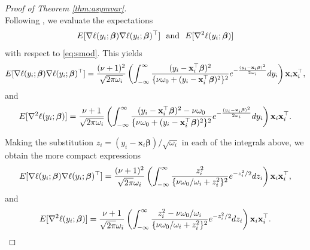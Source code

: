 \documentclass[12pt]{article}
\newcommand{\Exp}[1]{{\rm{E}}[ #1 ]}
\newcommand{\bl}[1]{{\mathbf #1}}
\newcommand{\bs}[1]{\boldsymbol #1}
\begin{document}
\begin{proof}[Proof of Theorem \ref{thm:asymvar}]
\begin{equation*}
\end{equation*}
Following \cite{stefanski_calculus_2002}, we evaluate the expectations
\begin{equation*}
\begin{aligned}
    \Exp{  \nabla \ell(y_i ; \bs{\beta}) \nabla \ell(y_i ; \bs{\beta})^\top}~\text{ and }~\Exp{ \nabla^2 \ell(y_i ; \bs{\beta}) }
\end{aligned}
\end{equation*}
with respect to \eqref{eq:smod}. This yields
\begin{equation}
    \begin{aligned}
        \Exp{  \nabla \ell(y_i ; \bs{\beta}) \nabla \ell(y_i ; \bs{\beta})^\top} = \frac{(\nu+1)^2}{\sqrt{2 \pi \omega_i}} \left(\int_{-\infty}^\infty \frac{(y_i - \bl{x}_i^\top \bs{\beta})^2}{\{\nu \omega_0 + (y_i - \bl{x}_i^\top \bs{\beta})^2\}^2 } e^{-\frac{(y_i - \bl{x}_i \bs{\beta})^2}{2\omega_i}} dy_i \right)\bl{x}_i \bl{x}_i^\top,
    \end{aligned}
\end{equation}
and
\begin{equation}\label{eq:int0}
    \begin{aligned}
        \Exp{ \nabla^2 \ell(y_i ; \bs{\beta}) } = \frac{\nu+1}{\sqrt{2\pi \omega_i}} \left(\int_{-\infty}^\infty \frac{(y_i - \bl{x}_i^\top \bs{\beta})^2 - \nu \omega_0}{\{\nu \omega_0 + (y_i - \bl{x}_i^\top \bs{\beta})^2\}^2} e^{-\frac{(y_i - \bl{x}_i \bs{\beta})^2}{2\omega_i}} dy_i \right) \bl{x}_i \bl{x}_i^\top .
    \end{aligned}
\end{equation}

Making the substitution $z_i = (y_i - \bl{x}_i \bs{\beta})/\sqrt{\omega_i}$ in each of the integrals above, we obtain the more compact expressions
\begin{equation}\label{eq:int1}
    \begin{aligned}
        \Exp{  \nabla \ell(y_i ; \bs{\beta}) \nabla \ell(y_i ; \bs{\beta})^\top} = \frac{(\nu+1)^2}{\sqrt{2 \pi}\omega_i} \left(\int_{-\infty}^\infty \frac{z_i^2}{\{\nu \omega_0/\omega_i + z_i^2\}^2 } e^{-z_i^2 / 2} dz_i \right)\bl{x}_i \bl{x}_i^\top,
    \end{aligned}
\end{equation}
and
\begin{equation}\label{eq:int2}
    \begin{aligned}
        \Exp{ \nabla^2 \ell(y_i ; \bs{\beta}) } = \frac{\nu+1}{\sqrt{2\pi} \omega_i} \left(\int_{-\infty}^\infty \frac{z_i^2 - \nu \omega_0 /\omega_i}{\{\nu \omega_0 / \omega_i + z_i^2\}^2} e^{-z_i^2/2} dz_i \right) \bl{x}_i \bl{x}_i^\top .
    \end{aligned}
\end{equation}


\end{proof}
\end{document}
